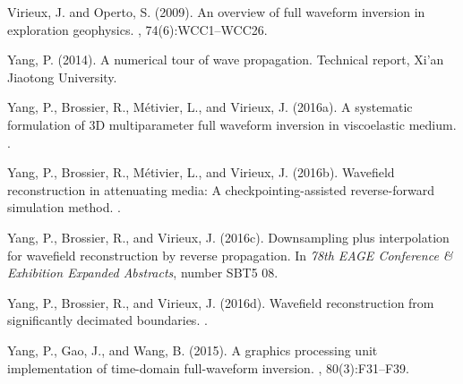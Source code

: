 \begin{thebibliography}{}
Virieux, J. and Operto, S. (2009).
\newblock An overview of full waveform inversion in exploration geophysics.
, 74(6):WCC1--WCC26.

Yang, P. (2014).
\newblock A numerical tour of wave propagation.
\newblock Technical report, Xi'an Jiaotong University.

Yang, P., Brossier, R., M\'etivier, L., and Virieux, J. (2016a).
\newblock A systematic formulation of {3D} multiparameter full waveform
  inversion in viscoelastic medium.
.

Yang, P., Brossier, R., M\'etivier, L., and Virieux, J. (2016b).
\newblock Wavefield reconstruction in attenuating media: A
  checkpointing-assisted reverse-forward simulation method.
.

Yang, P., Brossier, R., and Virieux, J. (2016c).
\newblock Downsampling plus interpolation for wavefield reconstruction by
  reverse propagation.
\newblock In {\em 78th EAGE Conference \& Exhibition Expanded Abstracts},
  number SBT5 08.

Yang, P., Brossier, R., and Virieux, J. (2016d).
\newblock Wavefield reconstruction from significantly decimated boundaries.
.

Yang, P., Gao, J., and Wang, B. (2015).
\newblock A graphics processing unit implementation of time-domain
  full-waveform inversion.
, 80(3):F31--F39.

\end{thebibliography}
